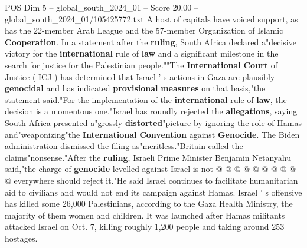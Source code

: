\begin{textsample}{POS Dim 5 – global\_south\_2024\_01 – Score 20.00 – global\_south\_2024\_01/105425772.txt}
A host of capitals have voiced support, as has the 22-member Arab League and the 57-member Organization of Islamic \textbf{Cooperation}.
In a statement after the \textbf{ruling}, South Africa declared a"decisive victory for the \textbf{international} rule of \textbf{law} and a significant milestone in the search for justice for the Palestinian people.""The \textbf{International} \textbf{Court} of Justice ( ICJ ) has determined that Israel ' s actions in Gaza are plausibly \textbf{genocidal} and has indicated \textbf{provisional} \textbf{measures} on that basis,"the statement said."For the implementation of the \textbf{international} rule of \textbf{law}, the decision is a momentous one."Israel has roundly rejected the \textbf{allegations}, saying South Africa presented a"grossly \textbf{distorted}"picture by ignoring the role of Hamas and"weaponizing"the \textbf{International} \textbf{Convention} against \textbf{Genocide}.
The Biden administration dismissed the filing as"meritless."Britain called the claims"nonsense."After the \textbf{ruling}, Israeli Prime Minister Benjamin Netanyahu said,"the charge of \textbf{genocide} levelled against Israel is not @ @ @ @ @ @ @ @ @ @ everywhere should reject it."He said Israel continues to facilitate humanitarian aid to civilians and would not end its campaign against Hamas.
Israel ' s offensive has killed some 26,000 Palestinians, according to the Gaza Health Ministry, the majority of them women and children.
It was launched after Hamas militants attacked Israel on Oct. 7, killing roughly 1,200 people and taking around 253 hostages.

\end{textsample}
